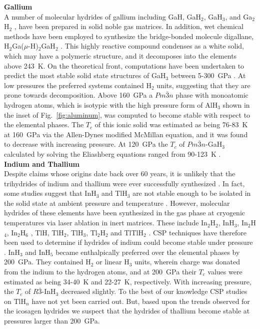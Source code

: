 \documentclass[12pt,letterpaper,oneside]{article}
\begin{document}
\noindent\textbf{Gallium}\\
%
A number of molecular hydrides of gallium including GaH, GaH$_2$, GaH$_3$, and Ga$_2$H$_2$ \cite{Himmel:2002-13}, have been prepared in solid noble gas matrices. In addition, wet chemical methods have been employed to synthesize the bridge-bonded molecule digallane, H$_2$Ga($\mu$-H)$_2$GaH$_2$ \cite{Pulham:1991}. This highly reactive compound \cite{Downs:1994-Ga} condenses as a white solid, which may have a polymeric structure, and it decomposes into the elements above 243~K. On the theoretical front, computations have been undertaken to predict the most stable solid state structures of GaH$_3$ between 5-300~GPa \cite{Gao:2011a}. At low pressures the preferred systems contained H$_2$ units, suggesting that they are prone towards decomposition. Above 160~GPa a $Pm\bar{3}n$ phase with monoatomic hydrogen atoms, which is isotypic with the high pressure form of AlH$_3$ shown in the inset of Fig.\ \ref{fig:aluminum}, was computed to become stable with respect to the elemental phases. The $T_c$ of this ionic solid was estimated as being 76-83~K at 160~GPa via the Allen-Dynes modified McMillan equation, and it was found to decrease with increasing pressure. At 120~GPa the $T_c$ of $Pm\bar{3}n$-GaH$_3$ calculated by solving the Eliashberg equations ranged from 90-123~K \cite{Szczesniak:2014}.\\

\noindent\textbf{Indium and Thallium}\\
Despite claims whose origins date back over 60 years, it is unlikely that the trihydrides of indium and thallium were ever successfully synthesized \cite{Downs:1994}. In fact, some studies suggest that InH$_3$ and TlH$_3$ are not stable enough to be isolated in the solid state at ambient pressure and temperature \cite{Hunt:1996-13,Andrews:2004-In}. However, molecular hydrides of these elements have been synthesized in the gas phase at cryogenic temperatures via laser ablation in inert matrices. These include In$_2$H$_2$, InH$_3$,  In$_2$H$_4$, In$_2$H$_6$ \cite{Himmel:2002-13,Andrews:2004-In,Wang:2004-In}, TlH, TlH$_2$, TlH$_3$, Tl$_2$H$_2$ and TlTlH$_2$ \cite{Wang:2004-Tl}. CSP techniques have therefore been used to determine if hydrides of indium could become stable under pressure \cite{Liu:2015a}. InH$_{3}$ and InH$_{5}$ became enthalpically preferred over the elemental phases by 200~GPa. They contained H$_2$ or linear H$_3$ units, wherein charge was donated from the indium to the hydrogen atoms, and at 200~GPa their $T_c$ values were estimated as being 34-40~K and 22-27~K, respectively. With increasing pressure, the $T_c$ of $R\bar{3}$-InH$_3$ decreased slightly. To the best of our knowledge CSP studies on TlH$_n$ have not yet been carried out. But, based upon the trends observed for the icosagen hydrides we suspect that the hydrides of thallium become stable at pressures larger than 200~GPa.
\end{document}
